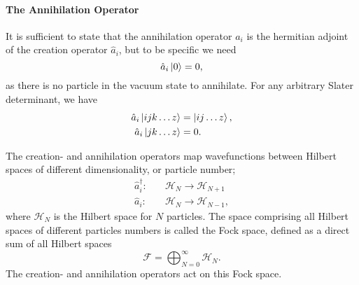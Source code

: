     \paragraph{The Annihilation Operator}
    It is sufficient to state that the 
    annihilation operator $a_i$ is the hermitian adjoint of the creation operator
    $\hat{a}_i$, but to be specific we need
    \begin{equation}
        \hat{a}_i\ket{0} = 0,
    \end{equation}
    as there is no particle in the vacuum state to annihilate. 
    For any arbitrary Slater determinant, we have 
    \begin{align}
        \hat{a}_i \ket{ijk \dots z} &= \ket{ij \dots z}, \\
        \hat{a}_i \ket{jk \dots z} &= 0.
    \end{align}

    The creation- and annihilation operators map wavefunctions between Hilbert spaces of 
    different dimensionality, or particle number;
    \begin{align}
        \hat{a}^\dagger_i: &\quad \mathcal{H}_N \to \mathcal{H}_{N+1} \\
        \hat{a}_i: &\quad \mathcal{H}_N \to \mathcal{H}_{N-1},
    \end{align}
    where $\mathcal{H}_N$ is the Hilbert space for $N$ particles. The space comprising
    all Hilbert spaces of different particles numbers is called the Fock space, defined 
    as a direct sum of all Hilbert spaces
    \begin{equation}
        \mathscr{F} = \bigoplus_{N=0}^\infty \mathcal{H}_N.
    \end{equation}
    The creation- and annihilation operators act on this Fock space.

